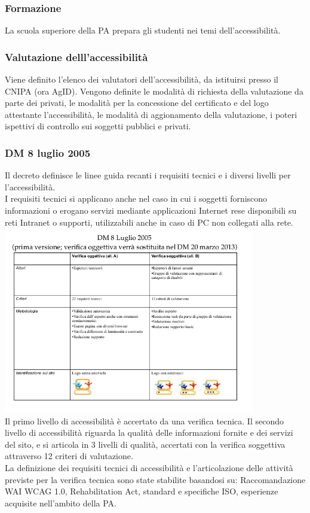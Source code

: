 \documentclass{article}
\begin{document}
\subsubsection{Formazione}
La scuola superiore della PA prepara gli studenti nei temi dell'accessibilità.
\subsubsection{Valutazione delll'accessibilità}
Viene definito l'elenco dei valutatori dell'accessibilità, da istituirsi presso il CNIPA (ora AgID). Vengono definite le modalità di richiesta della valutazione da parte dei privati, le modalità per la concessione del certificato e del logo attestante l'accessibilità, le modalità di aggionamento della valutazione, i poteri ispettivi di controllo sui soggetti pubblici e privati.
\subsubsection{DM 8 luglio 2005}
Il decreto definisce le linee guida recanti i requisiti tecnici e i diversi livelli per l'accessibilità.\\
I requisiti tecnici si applicano anche nel caso in cui i soggetti forniscono informazioni o erogano servizi mediante applicazioni Internet rese disponibili su reti Intranet o supporti, utilizzabili anche in caso di PC non collegati alla rete.\\
\includegraphics[width=11cm]{8lug2005}\\
Il primo livello di accessibilità è accertato da una verifica tecnica. Il secondo livello di accessibilità riguarda la qualità delle informazioni fornite e dei servizi del sito, e si articola in 3 livelli di qualità, accertati con la verifica soggettiva attraverso 12 criteri di valutazione.\\
La definizione dei requisiti tecnici di accessibilità e l'articolazione delle attività previste per la verifica tecnica sono state stabilite basandosi su: Raccomandazione WAI WCAG 1.0, Rehabilitation Act, standard e specifiche ISO, esperienze acquisite nell'ambito della PA.
\end{document}
